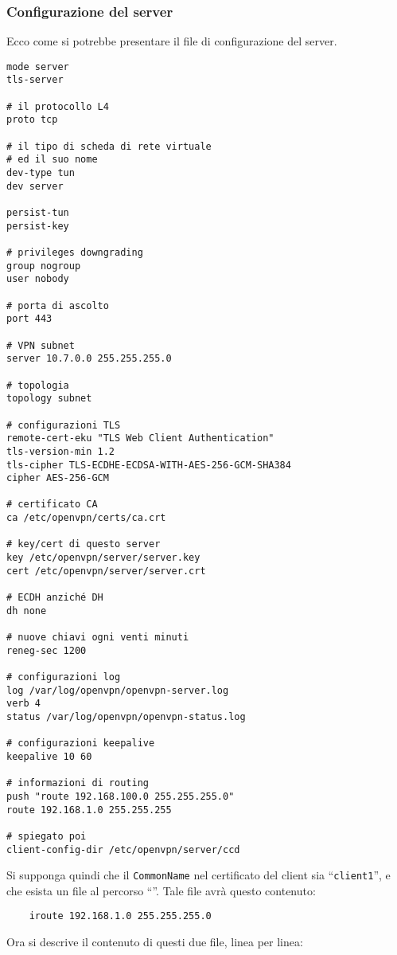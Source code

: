 \subsubsection{Configurazione del server}
Ecco come si potrebbe presentare
il file di configurazione del server.
\begin{verbatim}
mode server
tls-server
	
# il protocollo L4
proto tcp
	
# il tipo di scheda di rete virtuale
# ed il suo nome
dev-type tun
dev server
	
persist-tun
persist-key
	
# privileges downgrading
group nogroup
user nobody
	
# porta di ascolto
port 443
	
# VPN subnet
server 10.7.0.0 255.255.255.0
	
# topologia
topology subnet
	
# configurazioni TLS
remote-cert-eku "TLS Web Client Authentication"
tls-version-min 1.2
tls-cipher TLS-ECDHE-ECDSA-WITH-AES-256-GCM-SHA384
cipher AES-256-GCM
	
# certificato CA
ca /etc/openvpn/certs/ca.crt
	
# key/cert di questo server
key /etc/openvpn/server/server.key
cert /etc/openvpn/server/server.crt
	
# ECDH anziché DH
dh none
	
# nuove chiavi ogni venti minuti
reneg-sec 1200
	
# configurazioni log
log /var/log/openvpn/openvpn-server.log
verb 4
status /var/log/openvpn/openvpn-status.log
	
# configurazioni keepalive
keepalive 10 60
	
# informazioni di routing
push "route 192.168.100.0 255.255.255.0"
route 192.168.1.0 255.255.255
	
# spiegato poi
client-config-dir /etc/openvpn/server/ccd
\end{verbatim}
Si supponga quindi che il \texttt{CommonName} nel certificato del client sia
``\texttt{client1}'', e che esista un file al percorso
``''. Tale file avrà questo contenuto:
\begin{verbatim}
	iroute 192.168.1.0 255.255.255.0
\end{verbatim}
Ora si descrive il contenuto di questi due file, linea per linea:
